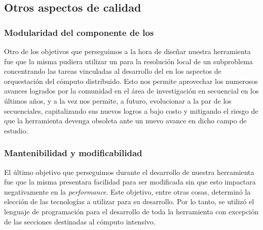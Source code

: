 \subsection{Otros aspectos de calidad}

%

\subsubsection{Modularidad del componente \ssolver de los \ws}

Otro de los objetivos que perseguimos a la hora de diseñar nuestra herramienta
fue que la misma pudiera utilizar un \ssolver \ots para la resolución local de
un subproblema concentrando las tareas vinculadas al desarrollo del \ssolver en 
los aspectos de orquestación del cómputo distribuido. Esto nos permite aprovechar 
los numerosos avances logrados por
la comunidad en el área de investigación en \ssolving secuencial en los últimos
años, y a la vez nos permite, a futuro, evolucionar a la par de los \ssolvers
secuenciales, capitalizando sus nuevos logros a bajo costo y mitigando el
riesgo de que la herramienta devenga obsoleta ante un nuevo avance en dicho
campo de estudio.

\subsubsection{Mantenibilidad y modificabilidad}

El último objetivo que perseguimos durante el desarrollo de nuestra
herramienta fue que la misma presentara facilidad para ser modificada sin que
esto impactara negativamente en la \emph{performance}. Este objetivo, entre
otras cosas, determinó la elección de las tecnologías a utilizar para su
desarrollo. Por lo tanto, se utilizó el lenguaje de programación \Python para
el desarrollo de toda la herramienta con excepción de las secciones destinadas al cómputo
intensivo.

